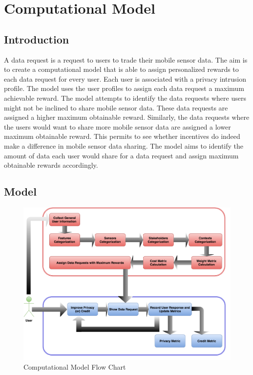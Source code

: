 \chapter{Computational Model} \label{model}

\newcommand{\numcategories}[0]{$n_{cat}$ }
\newcommand{\numsubcategories}[0]{$cat$ }
\newcommand{\numsensors}[0]{$N_S$ }
\newcommand{\numstakeholders}[0]{$N_{DC}$ }
\newcommand{\numcontexts}[0]{$N_C$ }
\newcommand{\numquestions}[0]{$n_{dr}$ } 
\newcommand{\numsubfeatures}[0]{$n_{sf}$ } 



\section{Introduction}
A data request is a request to users to trade their mobile sensor data. The aim is to create a computational model that is able to assign personalized rewards to each data request for every user.
Each user is associated with a privacy intrusion profile. The model uses the user profiles to assign each data request a maximum achievable reward. The model attempts to identify the data requests where users might not be inclined to share mobile sensor data. These data requests are assigned a higher maximum obtainable reward. Similarly, the data requests where the users would want to share more mobile sensor data
are assigned a lower maximum obtainable reward. This permits to see whether incentives do indeed make a difference in mobile sensor
data sharing. The model aims to identify the amount of data each user would share for a data request and assign maximum obtainable rewards accordingly.

\section{Model}

\begin{figure}[ht!]
\centering
\includegraphics[width=\textwidth,keepaspectratio	]{./images/model_building_blocks}
\caption{Computational Model Flow Chart \label{model_blocks}}
\end{figure}

